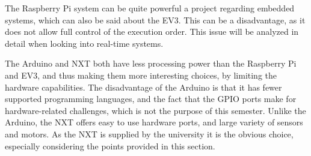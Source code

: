 The Raspberry Pi system can be quite powerful a project regarding embedded systems, which can also be said about the EV3.
This can be a disadvantage, as it does not allow full control of the execution order.
This issue will be analyzed in detail when looking into real-time systems.

The Arduino and NXT both have less processing power than the Raspberry Pi and EV3, and thus making them more interesting choices, by limiting the hardware capabilities.
The disadvantage of the Arduino is that it has fewer supported programming languages, and the fact that the GPIO ports make for hardware-related challenges, which is not the purpose of this semester.
Unlike the Arduino, the NXT offers easy to use hardware ports, and large variety of sensors and motors.
As the NXT is supplied by the university it is the obvious choice, especially considering the points provided in this section.


